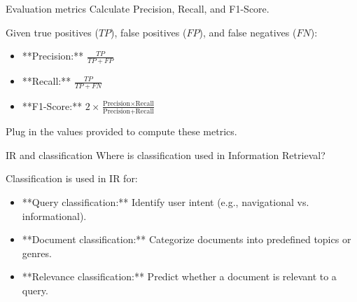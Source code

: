\documentclass{article}
\begin{document}
\begin{exercise}{Evaluation metrics}
  Calculate Precision, Recall, and F1-Score.

  \begin{solution}
    Given true positives (\(TP\)), false positives (\(FP\)), and false negatives (\(FN\)):
    \begin{itemize}
        \item **Precision:** \( \frac{TP}{TP + FP} \)
        \item **Recall:** \( \frac{TP}{TP + FN} \)
        \item **F1-Score:** \( 2 \times \frac{\text{Precision} \times \text{Recall}}{\text{Precision} + \text{Recall}} \)
    \end{itemize}
    Plug in the values provided to compute these metrics.
  \end{solution}
\end{exercise}

\begin{exercise}{IR and classification}
  Where is classification used in Information Retrieval?

  \begin{solution}
    Classification is used in IR for:
    \begin{itemize}
        \item **Query classification:** Identify user intent (e.g., navigational vs. informational).
        \item **Document classification:** Categorize documents into predefined topics or genres.
        \item **Relevance classification:** Predict whether a document is relevant to a query.
    \end{itemize}
  \end{solution}
\end{exercise}
\end{document}
